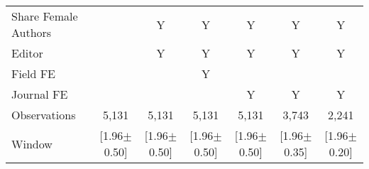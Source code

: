 \begin{tabular}{l*{6}{c}}
Share Female Authors &         &        Y&        Y&        Y&        Y&        Y\\
Editor          &         &        Y&        Y&        Y&        Y&        Y\\
Field FE        &         &         &        Y&         &         &         \\
Journal FE      &         &         &         &        Y&        Y&        Y\\
\hline
Observations    &    5,131&    5,131&    5,131&    5,131&    3,743&    2,241\\
Window          &[1.96$\pm$0.50]&[1.96$\pm$0.50]&[1.96$\pm$0.50]&[1.96$\pm$0.50]&[1.96$\pm$0.35]&[1.96$\pm$0.20]\\
\hline\hline
\end{tabular}
